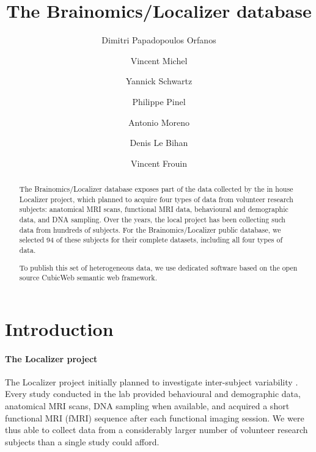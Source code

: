 \documentclass[review]{elsarticle}
\begin{document}
\begin{frontmatter}

\title{The Brainomics/Localizer database}

\author[Neurospin]{Dimitri Papadopoulos Orfanos}
\author[Logilab]{Vincent Michel}
\author[Parietal,Neurospin]{Yannick Schwartz}
\author[U992,Neurospin,ParisSud]{Philippe Pinel}
\author[U992,Neurospin,ParisSud]{Antonio Moreno}
\author[Neurospin]{Denis Le Bihan}
\author[Neurospin]{Vincent Frouin}

\address[Neurospin]{CEA, DSV/I2BM, NeuroSpin, 91191 Gif-sur-Yvette, France}
\address[U992]{INSERM, U992, Cognitive Neuroimaging Unit, 91191 Gif-sur-Yvette, France}
\address[Parietal]{Parietal team, Inria Saclay Île-de-France, 91120 Palaiseau, France}
\address[ParisSud]{Univ. Paris-Sud, Cognitive Neuroimaging Unit, 91191 Gif-sur-Yvette, France}
\address[Logilab]{Logilab, 104 boulevard Auguste Blanqui, 75013 Paris, France}

\begin{abstract}
The Brainomics/Localizer database exposes part of the data collected by the in house Localizer project, which planned to acquire four types of data from volunteer research subjects: anatomical MRI scans, functional MRI data, behavioural and demographic data, and DNA sampling. Over the years, the local project has been collecting such data from hundreds of subjects. For the Brainomics/Localizer public database, we selected 94 of these subjects for their complete datasets, including all four types of data.

To publish this set of heterogeneous data, we use dedicated software based on the open source CubicWeb semantic web framework.
\end{abstract}

\end{frontmatter}


\section{Introduction}

\paragraph{The Localizer project} The Localizer project initially planned to investigate inter-subject variability \cite{Pinel2007}. Every study conducted in the lab provided behavioural and demographic data, anatomical MRI scans, DNA sampling when available, and acquired a short functional MRI (fMRI) sequence after each functional imaging session. We were thus able to collect data from a considerably larger number of volunteer research subjects than a single study could afford. 
\end{document}
